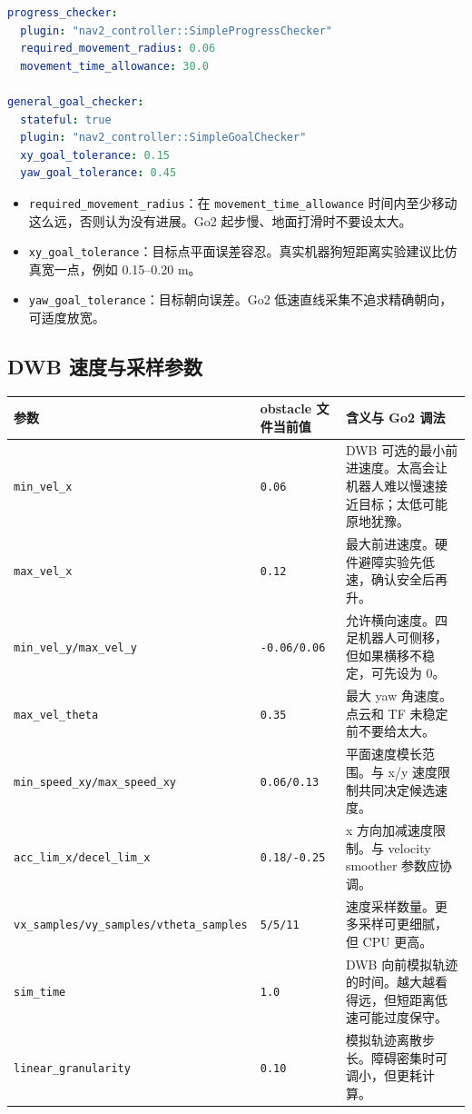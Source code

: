 \documentclass[UTF8,11pt,a4paper,openany]{ctexrep}
\newcommand{\code}[1]{\nolinkurl{#1}}
\newcommand{\param}[1]{\nolinkurl{#1}}
\begin{document}
\begin{lstlisting}[language=yaml]
progress_checker:
  plugin: "nav2_controller::SimpleProgressChecker"
  required_movement_radius: 0.06
  movement_time_allowance: 30.0

general_goal_checker:
  stateful: true
  plugin: "nav2_controller::SimpleGoalChecker"
  xy_goal_tolerance: 0.15
  yaw_goal_tolerance: 0.45
\end{lstlisting}

\begin{itemize}
  \item \param{required_movement_radius}：在 \param{movement_time_allowance} 时间内至少移动这么远，否则认为没有进展。Go2 起步慢、地面打滑时不要设太大。
  \item \param{xy_goal_tolerance}：目标点平面误差容忍。真实机器狗短距离实验建议比仿真宽一点，例如 0.15--0.20 m。
  \item \param{yaw_goal_tolerance}：目标朝向误差。Go2 低速直线采集不追求精确朝向，可适度放宽。
\end{itemize}

\subsection{DWB 速度与采样参数}

\begin{footnotesize}
\begin{longtable}{L{0.31\textwidth}L{0.17\textwidth}L{0.42\textwidth}}
\toprule
参数 & obstacle 文件当前值 & 含义与 Go2 调法 \\
\midrule
\param{min_vel_x} & \code{0.06} & DWB 可选的最小前进速度。太高会让机器人难以慢速接近目标；太低可能原地犹豫。 \\
\param{max_vel_x} & \code{0.12} & 最大前进速度。硬件避障实验先低速，确认安全后再升。 \\
\param{min_vel_y/max_vel_y} & \code{-0.06/0.06} & 允许横向速度。四足机器人可侧移，但如果横移不稳定，可先设为 0。 \\
\param{max_vel_theta} & \code{0.35} & 最大 yaw 角速度。点云和 TF 未稳定前不要给太大。 \\
\param{min_speed_xy/max_speed_xy} & \code{0.06/0.13} & 平面速度模长范围。与 x/y 速度限制共同决定候选速度。 \\
\param{acc_lim_x/decel_lim_x} & \code{0.18/-0.25} & x 方向加减速度限制。与 velocity smoother 参数应协调。 \\
\param{vx_samples/vy_samples/vtheta_samples} & \code{5/5/11} & 速度采样数量。更多采样可更细腻，但 CPU 更高。 \\
\param{sim_time} & \code{1.0} & DWB 向前模拟轨迹的时间。越大越看得远，但短距离低速可能过度保守。 \\
\param{linear_granularity} & \code{0.10} & 模拟轨迹离散步长。障碍密集时可调小，但更耗计算。 \\
\bottomrule
\end{longtable}
\end{footnotesize}
\end{document}
